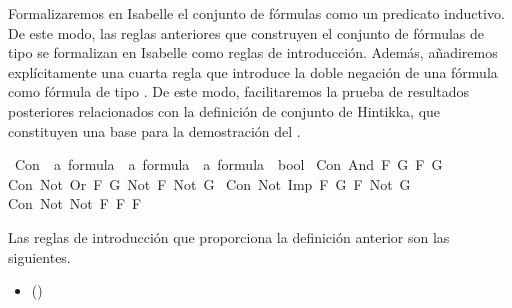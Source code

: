 \begin{isabellebody}
\begin{isamarkuptext}
  Formalizaremos en Isabelle el conjunto de fórmulas \isa{{\isasymalpha}} como un predicato inductivo. De este modo,
  las reglas anteriores que construyen el conjunto de fórmulas de tipo \isa{{\isasymalpha}} se formalizan en Isabelle 
  como reglas de introducción. Además, añadiremos explícitamente una cuarta regla que introduce la 
  doble negación de una fórmula como fórmula de tipo \isa{{\isasymalpha}}. De este modo, facilitaremos la prueba de 
  resultados posteriores relacionados con la definición de conjunto de Hintikka, que constituyen una
  base para la demostración del .%
\end{isamarkuptext}\isamarkuptrue%
\isamarkupfalse%
\ Con\ {\isacharcolon}{\isacharcolon}\ {\isachardoublequoteopen}{\isacharprime}a\ formula\ {\isacharequal}{\isachargreater}\ {\isacharprime}a\ formula\ {\isacharequal}{\isachargreater}\ {\isacharprime}a\ formula\ {\isacharequal}{\isachargreater}\ bool{\isachardoublequoteclose}\ \isanewline
{\isachardoublequoteopen}Con\ {\isacharparenleft}And\ F\ G{\isacharparenright}\ F\ G{\isachardoublequoteclose}\ {\isacharbar}\isanewline
{\isachardoublequoteopen}Con\ {\isacharparenleft}Not\ {\isacharparenleft}Or\ F\ G{\isacharparenright}{\isacharparenright}\ {\isacharparenleft}Not\ F{\isacharparenright}\ {\isacharparenleft}Not\ G{\isacharparenright}{\isachardoublequoteclose}\ {\isacharbar}\isanewline
{\isachardoublequoteopen}Con\ {\isacharparenleft}Not\ {\isacharparenleft}Imp\ F\ G{\isacharparenright}{\isacharparenright}\ F\ {\isacharparenleft}Not\ G{\isacharparenright}{\isachardoublequoteclose}\ {\isacharbar}\isanewline
{\isachardoublequoteopen}Con\ {\isacharparenleft}Not\ {\isacharparenleft}Not\ F{\isacharparenright}{\isacharparenright}\ F\ F{\isachardoublequoteclose}%
\begin{isamarkuptext}%
Las reglas de introducción que proporciona la definición anterior son
  las siguientes.

  \begin{itemize}
    \item[]  
      \hfill ()
  \end{itemize}
  

\end{isamarkuptext}
\end{isabellebody}
